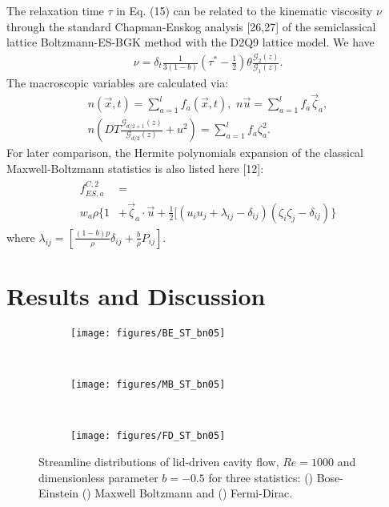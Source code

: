 \documentclass[doublecol]{epl2}
\begin{document}
The relaxation time $\tau$ in Eq. (15) can be related to the kinematic viscosity $\nu$ through the standard
Chapman-Enskog analysis [26,27] of the semiclassical lattice Boltzmann-ES-BGK method with the D2Q9 lattice model.  We have
\begin{align}
 \nu =\delta_t \frac{1}{3(1-b)}( \tau^* - \frac{1}{2}) \theta \frac{\mathcal{G}_{2}(z)}{\mathcal{G}_{1}(z)}.
\end{align}
The macroscopic variables are calculated via:
\begin{align}
n(\vec x, t) = \sum_{a=1}^l  f_a(\vec x, t), \,\,
n\vec u = \sum_{a=1}^l  f_a \vec \zeta_a, \nonumber \\
 n (DT \frac{\mathcal{G}_{d/2+1}(z)}{\mathcal{G}_{d/2}(z)} + u^2) = \sum_{a=1}^l f_a \zeta_a^2.
\end{align}
For later comparison, the Hermite polynomials expansion of the classical Maxwell-Boltzmann statistics is also listed here [12]:
\begin{align}
\begin{split}
f_{ES,a}^{C,2} &=  \\
w_a \rho \{ 1 &+ \vec \zeta_a \cdot \vec u + \frac{1}{2} [( u_i u_j +\lambda_{ij} -\delta_{ij})(\zeta_i \zeta_j - \delta_{ij}) \}
\end{split}
\end{align}
where $\lambda_{i j} = \left[\frac{(1-b)p}{\rho} \delta_{i j}+ \frac{b}{\rho}P_{i j } \right]$.

\section{Results and Discussion}

\begin{figure*}[ht]
\centering
        \begin{subfigure}[b]{0.3\textwidth}
                \centering
                \texttt{[image: figures/BE\_ST\_bn05]}
                \caption{ }
                \label{fig:BE_Streamlines_bn05}
        \end{subfigure}%
				~
				\begin{subfigure}[b]{0.3\textwidth}
                \centering
                \texttt{[image: figures/MB\_ST\_bn05]}
                \caption{ }
                \label{fig:MB_Streamlines_bn05}
        \end{subfigure}%
				~
				\begin{subfigure}[b]{0.3\textwidth}
                \centering
                \texttt{[image: figures/FD\_ST\_bn05]}
                \caption{ }
                \label{fig:FD_Streamlines_bn05}
        \end{subfigure}%
	\caption{Streamline distributions of lid-driven cavity flow, $Re=1000$ and dimensionless parameter $b=-0.5$ for three statistics:
	() Bose-Einstein () Maxwell Boltzmann and
 	() Fermi-Dirac.}
	\label{fig:Streamlines_bn05}
\end{figure*}
\end{document}
